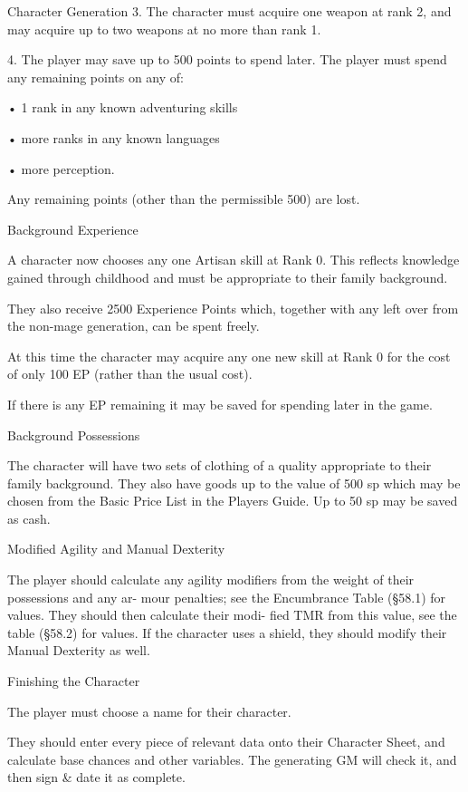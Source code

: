 \begin{Chapter}{Character Generation}
3.  The  character  must acquire  one  weapon  at  rank 
2, and may acquire up to two weapons at no more 
than rank 1. 

4.  The  player  may  save  up  to  500  points  to  spend 
later.  The  player  must  spend  any  remaining points 
on any of:  

• 1 rank in any known adventuring skills  

• more ranks in any known languages  

• more perception. 

Any  remaining  points  (other  than  the  permissible 
500) are lost. 

Background Experience 

A  character  now  chooses  any  one  Artisan  skill  at 
Rank  0.  This  reflects  knowledge  gained  through 
childhood  and  must  be  appropriate  to  their  family 
background. 

They  also  receive  2500  Experience  Points  which, 
together  with  any  left  over  from  the  non-mage 
generation, can be spent freely. 

At this time the character may acquire any one new 
skill at Rank 0 for the cost of only 100 EP (rather 
than the usual cost). 

If  there  is  any  EP  remaining  it  may  be  saved  for 
spending later in the game. 

Background Possessions 

The  character  will  have  two  sets  of  clothing  of  a 
quality  appropriate  to  their  family  background. 
They  also  have  goods  up  to  the  value  of  500  sp 
which may be chosen from the Basic Price  List in 
the  Players  Guide.  Up  to  50  sp  may  be  saved  as 
cash. 

Modified Agility and Manual Dexterity 

The  player  should  calculate  any  agility  modifiers 
from  the  weight  of  their  possessions  and  any  ar-
mour penalties; see the Encumbrance Table (§58.1) 
for  values.  They  should  then  calculate  their  modi-
fied TMR from this value, see the table (§58.2) for 
values.  If  the  character  uses  a  shield,  they  should 
modify their Manual Dexterity as well. 

Finishing the Character 

The player must choose a name for their character. 

They should enter every piece of relevant data onto 
their  Character  Sheet,  and  calculate  base  chances 
and other variables. The generating GM will check 
it, and then sign \& date it as complete. 

\end{Chapter}
